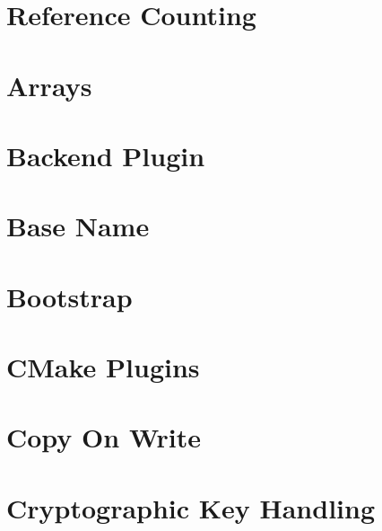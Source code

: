 \let\mypdfximage\pdfximage\def\pdfximage{\immediate\mypdfximage}\documentclass[twoside]{book}
\newcommand{\+}{\discretionary{\mbox{\scriptsize$\hookleftarrow$}}{}{}}
\begin{document}
\chapter{Reference Counting}
\label{doc_decisions_5_partially_implemented_reference_counting_md}

\chapter{Arrays}
\label{doc_decisions_5_partially_implemented_warning_array_md}

\chapter{Backend Plugin}
\label{doc_decisions_6_implemented_backend_plugin_md}

\chapter{Base Name}
\label{doc_decisions_6_implemented_base_name_md}

\chapter{Bootstrap}
\label{doc_decisions_6_implemented_bootstrap_md}

\chapter{CMake Plugins}
\label{doc_decisions_6_implemented_cmake_plugins_md}

\chapter{Copy On Write}
\label{doc_decisions_6_implemented_copy_on_write_md}

\chapter{Cryptographic Key Handling}
\label{doc_decisions_6_implemented_cryptograhic_key_handling_md}

\end{document}
